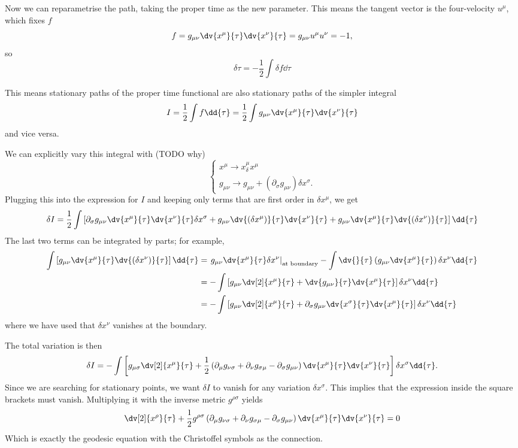 Now we can reparametrise the path, taking the proper time as the new parameter. This means the tangent vector is the four-velocity $u^\mu$, which fixes $f$
\[ f = g_{\mu\nu} \dv{x^\mu}{\tau}\dv{x^\nu}{\tau} = g_{\mu\nu}u^\mu u^\nu = -1, \]
so
\[ \delta \tau = - \frac{1}{2}\int\delta f \dd{\tau} \]

This means stationary paths of the proper time functional are also stationary paths of the simpler integral
\[ I = \frac{1}{2}\int f \dd{\tau} = \frac{1}{2}\int g_{\mu\nu} \dv{x^\mu}{\tau}\dv{x^\nu}{\tau} \]
and vice versa.

We can explicitly vary this integral with (TODO why)
\[ \begin{cases}
x^\mu \to x^\mu _ \delta x^\mu \\
g_{\mu\nu} \to g_{\mu\nu} + (\partial_\sigma g_{\mu\nu})\delta x^\sigma.
\end{cases} \]
Plugging this into the expression for $I$ and keeping only terms that are first order in $\delta x^\mu$, we get
\[ \delta I = \frac{1}{2}\int \left[\partial_\sigma g_{\mu\nu}\dv{x^\mu}{\tau}\dv{x^\nu}{\tau}\delta x^\sigma + g_{\mu\nu}\dv{(\delta x^\mu)}{\tau}\dv{x^\nu}{\tau} +g_{\mu\nu}\dv{x^\mu}{\tau}\dv{(\delta x^\nu)}{\tau}\right]\dd{\tau} \]
The last two terms can be integrated by parts; for example,
\begin{align*}
\int \left[ g_{\mu\nu}\dv{x^\mu}{\tau}\dv{(\delta x^\nu)}{\tau} \right]\dd{\tau} &= \left. g_{\mu\nu}\dv{x^\mu}{\tau}\delta x^\nu \right|_\text{at boundary} - \int \dv{}{\tau}\left(g_{\mu\nu}\dv{x^\mu}{\tau}\right)\delta x^\nu \dd{\tau} \\
&= - \int \left[g_{\mu\nu} \dv[2]{x^\mu}{\tau} + \dv{g_{\mu\nu}}{\tau}\dv{x^\mu}{\tau}\right]\delta x^\nu \dd{\tau} \\
&= - \int \left[g_{\mu\nu} \dv[2]{x^\mu}{\tau} + \partial_\sigma g_{\mu\nu}\dv{x^\sigma}{\tau}\dv{x^\mu}{\tau}\right]\delta x^\nu \dd{\tau}
\end{align*}
where we have used that $\delta x^\nu$ vanishes at the boundary.

The total variation is then
\[ \delta I = - \int \left[g_{\mu\sigma}\dv[2]{x^\mu}{\tau} + \frac{1}{2}\left(\partial_\mu g_{\nu\sigma} + \partial_\nu g_{\sigma\mu} - \partial_\sigma g_{\mu\nu}\right)\dv{x^\mu}{\tau}\dv{x^\nu}{\tau}\right]\delta x^\sigma \dd{\tau}. \]
Since we are searching for stationary points, we want $\delta I$ to vanish for any variation $\delta x^\sigma$. This implies that the expression inside the square brackets must vanish. Multiplying it with the inverse metric $g^{\rho\sigma}$ yields
\[ \dv[2]{x^\rho}{\tau} + \frac{1}{2}g^{\rho\sigma}\left(\partial_\mu g_{\nu\sigma} + \partial_\nu g_{\sigma\mu} - \partial_\sigma g_{\mu\nu}\right)\dv{x^\mu}{\tau}\dv{x^\nu}{\tau} = 0 \]
Which is exactly the geodesic equation with the Christoffel symbols as the connection.


